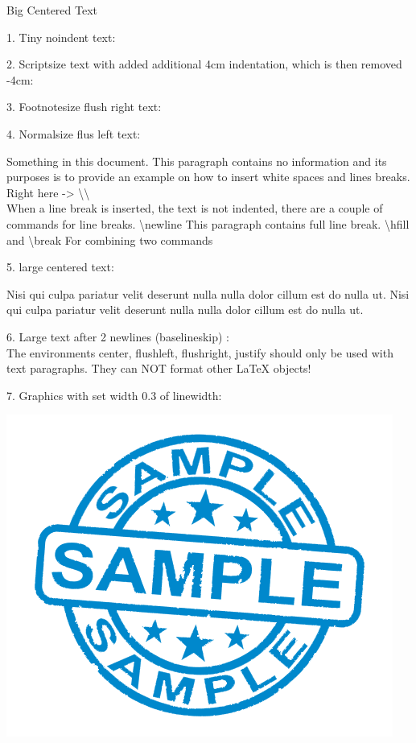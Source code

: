 \documentclass[12pt]{article}
\begin{document}
\begin{center}
    {\Huge Big Centered Text}
\end{center}

1. Tiny noindent text: \\
{\tiny\noindent\Blindtext[1][1]}

2. Scriptsize text with added additional 4cm indentation, which is then removed -4cm:

\addtolength{\parindent}{4cm}
{\scriptsize\Blindtext[1][1]}
\addtolength{\parindent}{-4cm}

3. Footnotesize flush right text:
\begin{flushright}
{\footnotesize\Blindtext[1][1]}
\end{flushright}

4. Normalsize flus left text:
\begin{flushleft}
{\normalsize Something in this document. This paragraph contains no information and its purposes is to provide an example on how to insert white spaces and lines breaks. Right here -> \textbackslash\textbackslash \\
When a line break is inserted, the text is not indented, there are a couple of commands for line breaks. \textbackslash newline \newline
This paragraph contains full line break. \textbackslash hfill and \textbackslash break \hfill \break For combining two commands}
\end{flushleft}

5. large centered text:
\begin{center}
{\large Nisi qui culpa pariatur velit deserunt nulla nulla dolor cillum est do nulla ut. Nisi qui culpa pariatur velit deserunt nulla nulla dolor cillum est do nulla ut.}
\end{center}

6. Large text after 2 newlines (baselineskip) : \\[2\baselineskip]

{\Large The environments center, flushleft, flushright, justify should only be used with text paragraphs. They can NOT format other LaTeX objects!}

7. Graphics with set width 0.3 of linewidth:
\begin{center}
    \includegraphics[width=0.3\linewidth]{sample.png}
\end{center}
\end{document}
